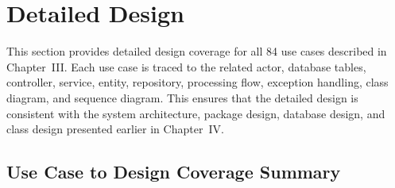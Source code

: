 \providecommand{\SequenceDiagram}[7]{
\begin{figure}[H]
\centering
\resizebox{\textwidth}{!}{
\begin{tikzpicture}
    \node[participant] (actor) at (0,0) {#2};
    \node[participant] (ui) at (2.8,0) {Web UI};
    \node[participant] (controller) at (5.6,0) {#4};
    \node[participant] (service) at (8.4,0) {#5};
    \node[participant] (repo) at (11.2,0) {#6};
    \node[participant] (ext) at (14.0,0) {Database/API};

    \foreach \x in {0,2.8,5.6,8.4,11.2,14.0} {
        \draw[sequenceline] (\x,-0.35) -- (\x,-7.1);
    }

    \draw[seqmessage] (0,-0.8) -- node[above,font=\scriptsize]{1. #3} (2.8,-0.8);
    \draw[seqmessage] (2.8,-1.55) -- node[above,font=\scriptsize]{2. submit request} (5.6,-1.55);
    \draw[seqmessage] (5.6,-2.3) -- node[above,font=\scriptsize]{3. validate and call service} (8.4,-2.3);
    \draw[seqmessage] (8.4,-3.05) -- node[above,font=\scriptsize]{4. load or save data} (11.2,-3.05);
    \draw[seqmessage] (11.2,-3.8) -- node[above,font=\scriptsize]{5. query/update} (14.0,-3.8);
    \draw[seqreturn] (11.2,-4.55) -- node[above,font=\scriptsize]{6. return data} (14.0,-4.55);
    \draw[seqreturn] (8.4,-5.3) -- node[above,font=\scriptsize]{7. build result} (11.2,-5.3);
    \draw[seqreturn] (5.6,-6.05) -- node[above,font=\scriptsize]{8. return response} (8.4,-6.05);
    \draw[seqreturn] (2.8,-6.8) -- node[above,font=\scriptsize]{9. #7} (5.6,-6.8);
\end{tikzpicture}
}
\caption{Sequence diagram for #1}
\end{figure}
}

\section{Detailed Design}

This section provides detailed design coverage for all 84 use cases described in Chapter~III. Each use case is traced to the related actor, database tables, controller, service, entity, repository, processing flow, exception handling, class diagram, and sequence diagram. This ensures that the detailed design is consistent with the system architecture, package design, database design, and class design presented earlier in Chapter~IV.

\subsection{Use Case to Design Coverage Summary}

